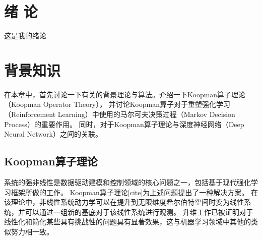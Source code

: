 \documentclass[AutoFakeBold]{LZUThesis}
\begin{document}
%
%
%


\frontmatter






\tableofcontents




\mainmatter

\chapter{\texorpdfstring{绪 \quad 论}{绪论}}

这是我的绪论\cite{tenne1992polyhedral}

\chapter{背景知识}
在本章中，首先讨论一下有关的背景理论与算法。介绍一下Koopman算子理论（Koopman Operator Theory），
并讨论Koopman算子对于重塑强化学习（Reinforcement Learning）中使用的马尔可夫决策过程（Markov Decision Process）的重要作用。
同时，对于Koopman算子理论与深度神经网络（Deep Neural Network）之间的关联。

\section{Koopman算子理论}
系统的强非线性是数据驱动建模和控制领域的核心问题之一，包括基于现代强化学习框架所做的工作。
Koopman算子理论[cite]为上述问题提出了一种解决方案。
在该理论中，非线性系统动力学可以在提升到无限维度希尔伯特空间时变为线性系统，并可以通过一组新的基底对于该线性系统进行观测。
升维工作已被证明对于线性化和简化某些具有挑战性的问题具有显著效果，这与机器学习领域中其他的类似努力相一致。
\end{document}
